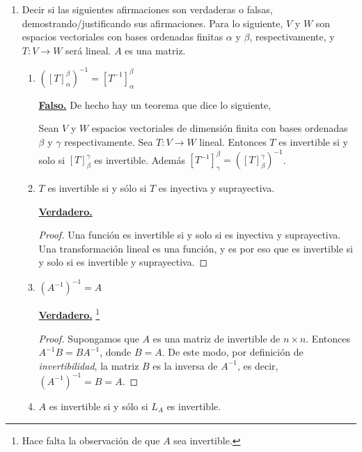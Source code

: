 \documentclass[letterpaper]{article}
\newcommand{\verd}{\textbf{\underline{Verdadero.} }}
\newcommand{\fals}{\textbf{\underline{Falso.} }}
\begin{document}
\begin{enumerate}

\item Decir si las siguientes afirmaciones son verdaderas o falsas,
demostrando/justificando sus afirmaciones. Para lo siguiente, $V$ y $W$ son espacios vectoriales con bases
ordenadas finitas $\alpha$ y $\beta$, respectivamente, y $T : V \to W$ será lineal. $A$ es una matriz.

\begin{enumerate}[label=(\alph*)]
    \item $\left([T]^{\beta}_{\alpha} \right)^{-1} = [T^{-1}]^{\beta}_{\alpha}$ 
    
    \fals De hecho hay un teorema que dice lo siguiente,

    \begin{theorem*}
        Sean $V$ y $W$ espacios vectoriales de dimensión finita con bases ordenadas $\beta$ y $\gamma$
        respectivamente. Sea $T : V \to W$ lineal. Entonces $T$ es invertible si y solo si $[T]_\beta^\gamma$
        es invertible. Además $[T^{-1}]^\beta_\gamma = \left([T]^\gamma_\beta \right)^{-1}$. 
    \end{theorem*}

    \item $T$ es invertible si y sólo si $T$ es inyectiva y suprayectiva.
    
    \verd\begin{proof}
        Una función es invertible si y solo si es inyectiva y suprayectiva.
        Una transformación lineal es una función, y es por eso que es invertible si y solo si es invertible
        y suprayectiva.
    \end{proof}

    \item $\left( A^{-1} \right)^{-1} = A$
    
    \verd\footnote{Hace falta la observación de que $A$ sea invertible.}
    \begin{proof}
        Supongamos que $A$ es una matriz de invertible de $n \times n$. Entonces $A^{-1}B = BA^{-1}$, donde
        $B = A$. De este modo, por definición de \emph{invertibilidad}, la matriz $B$ es la inversa de
        $A^{-1}$, es decir, $\left( A^{-1} \right)^{-1} = B = A$.
    \end{proof}

    \item $A$ es invertible si y sólo si $L_A$ es invertible.


\end{enumerate}
\end{enumerate}
\end{document}
